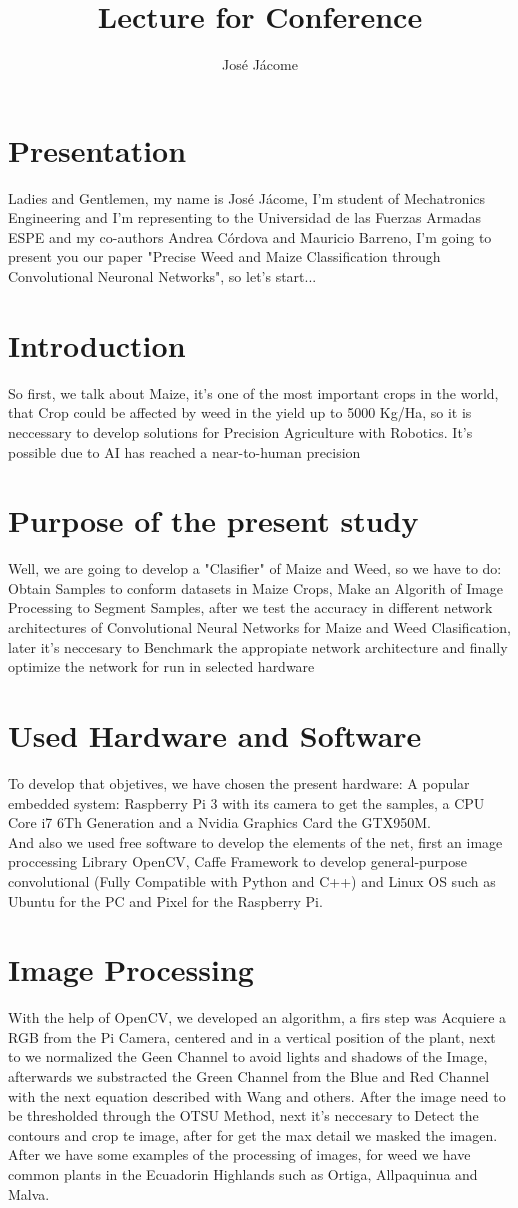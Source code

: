 \documentclass[10pt,a4paper]{proc}
\author{José Jácome}
\title{Lecture for Conference}
\begin{document}
\section{Presentation}
Ladies and Gentlemen, my name is Jos\'e J\'acome, I'm student of Mechatronics Engineering and I'm representing to the Universidad de las Fuerzas Armadas ESPE and my co-authors Andrea C\'ordova and Mauricio Barreno, I'm going to present you our paper "Precise Weed and Maize Classification through Convolutional Neuronal Networks", so let's start...
\section{Introduction}
So first, we talk about Maize, it's one of the most important crops in the world, that Crop could be affected by weed in the yield up to 5000 Kg/Ha, so it is neccessary to develop solutions for Precision Agriculture with Robotics. It's possible due to AI has reached a near-to-human precision
\section{Purpose of the present study}
Well, we are going to develop a "Clasifier" of Maize and Weed, so we have to do:
Obtain Samples to conform datasets in Maize Crops, Make an Algorith of Image Processing to Segment Samples, after we test the accuracy in different network architectures of Convolutional Neural Networks for Maize and Weed Clasification, later it's neccesary to Benchmark the appropiate network architecture  and finally optimize the network for run in selected hardware 
\section{Used Hardware and Software}
To develop that objetives, we have chosen the present hardware: A popular embedded system: Raspberry Pi 3 with its camera to get the samples, a CPU Core i7 6Th Generation and a Nvidia Graphics Card the GTX950M. \\
And also we used free software to develop the elements of the net, first an image proccessing Library OpenCV, Caffe Framework to develop general-purpose convolutional (Fully Compatible with Python and C++) and Linux OS such as Ubuntu for the PC and Pixel for the Raspberry Pi.

\section{Image Processing}
With the help of OpenCV, we developed an algorithm, a firs step was Acquiere a RGB from the Pi Camera, centered and in a vertical position of the plant, next to we normalized the Geen Channel to avoid lights and shadows of the Image, afterwards we substracted the Green Channel from the Blue and Red Channel with the next equation described with Wang and others. After the image need to be thresholded through the OTSU Method, next it's neccesary to Detect the contours and crop te image, after for get the max detail we masked the imagen. After we have some examples of the processing of images, for weed we have common plants in the Ecuadorin Highlands such as Ortiga, Allpaquinua and Malva. 
\end{document}
